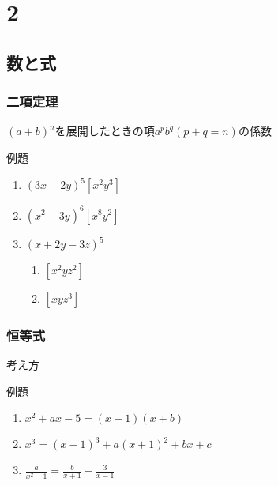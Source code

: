 \documentclass[10pt,dvipdfmx]{jsarticle}
\begin{document}
\section*{2}
\subsection*{数と式}
\subsubsection*{二項定理}
$(a+b)^n$を展開したときの項$a^pb^q(p+q=n)$の係数
\begin{itembox}[l]{例題}
  \begin{large}
    \begin{multicols}{2}
      \begin{enumerate}
        \item $(3x-2y)^5 [x^2y^3]$
        \item $(x^2-3y)^6 [x^8y^2]$\\
        \item $(x+2y-3z)^5$
              \begin{enumerate}
                \item $[x^2yz^2]$
                \item $[xyz^3]$
              \end{enumerate}
      \end{enumerate}
    \end{multicols}

  \end{large}
\end{itembox}

\subsubsection*{恒等式}
\begin{itembox}[l]{考え方}
  \vspace{8mm}
\end{itembox}
\begin{itembox}[l]{例題}
  \begin{large}
    \begin{enumerate}
      \item $x^2+ax-5=(x-1)(x+b)$
      \item $x^3=(x-1)^3+a(x+1)^2+bx+c$
      \item $\frac{a}{x^2-1}=\frac{b}{x+1}-\frac{3}{x-1}$
    \end{enumerate}
  \end{large}
\end{itembox}
\end{document}
